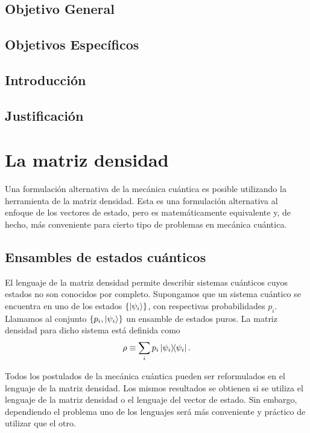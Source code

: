 \documentclass[12pt]{report}
\begin{document}
\newtheorem{definition}{Definición}[section]

\newtheorem{teorema}{Teorema}[section]

\newtheorem{property}{Propiedad}[section]

\section*{Objetivo General}



\section*{Objetivos Específicos}


\section*{Introducción}


\section*{Justificación}


\chapter{La matriz densidad}
Una formulación alternativa de la mecánica cuántica es posible utilizando la herramienta de
la matriz densidad. Esta es una formulación alternativa al enfoque de los vectores de estado,
pero es matemáticamente equivalente y, de hecho, más conveniente para cierto tipo de problemas
en mecánica cuántica. 

\section{Ensambles de estados cuánticos}
El lenguaje de la matriz densidad permite describir sistemas cuánticos cuyos estados no son 
conocidos por completo. Supongamos que un sistema cuántico se encuentra en uno de los estados 
$\{\ket{\psi _i}\}$, con respectivas probabilidades $p_i$. Llamamos al conjunto $\{p_i, 
\ket{\psi _i} \}$ un ensamble de estados puros. La matriz densidad para dicho sistema está 
definida como
\begin{equation}
	\rho \equiv \sum _i p_i\dyad{\psi_i}{\psi_i}.
	\label{eq:rho_def}
\end{equation}

Todos los postulados de la mecánica cuántica pueden ser reformulados en el lenguaje de la matriz
densidad. Los mismos resultados se obtienen si se utiliza el lenguaje de la matriz densidad o el
lenguaje del vector de estado. Sin embargo, dependiendo el problema uno de los lenguajes será más
conveniente y práctico de utilizar que el otro. 
\end{document}
